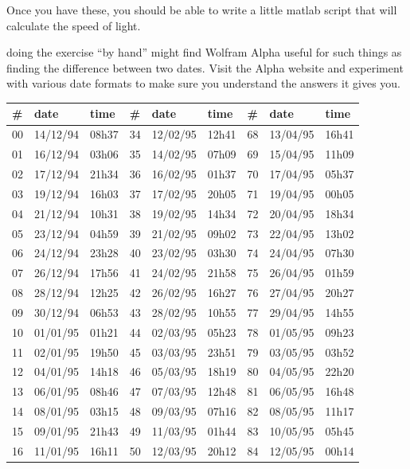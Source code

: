 \documentclass{tufte-handout}
\begin{document}
Once you have these, you should be able to write a little {\sc matlab} script that will calculate the speed of light.

 doing the exercise ``by hand'' might find Wolfram Alpha useful for such things as finding the difference between two dates.  Visit the Alpha website and experiment with various date formats to make sure you understand the answers it gives you.


\begin{table}
\begin{tabular}{lll|lll|lll}
\# & date & time & \# & date & time & \# & date & time \\ \hline
00 & 14/12/94 & 08h37 & 34 & 12/02/95 & 12h41 & 68 & 13/04/95 & 16h41 \\
01 & 16/12/94 & 03h06 & 35 & 14/02/95 & 07h09 & 69 & 15/04/95 & 11h09 \\
02 & 17/12/94 & 21h34 & 36 & 16/02/95 & 01h37 & 70 & 17/04/95 & 05h37 \\
03 & 19/12/94 & 16h03 & 37 & 17/02/95 & 20h05 & 71 & 19/04/95 & 00h05 \\
04 & 21/12/94 & 10h31 & 38 & 19/02/95 & 14h34 & 72 & 20/04/95 & 18h34 \\
05 & 23/12/94 & 04h59 & 39 & 21/02/95 & 09h02 & 73 & 22/04/95 & 13h02 \\
06 & 24/12/94 & 23h28 & 40 & 23/02/95 & 03h30 & 74 & 24/04/95 & 07h30 \\
07 & 26/12/94 & 17h56 & 41 & 24/02/95 & 21h58 & 75 & 26/04/95 & 01h59 \\
08 & 28/12/94 & 12h25 & 42 & 26/02/95 & 16h27 & 76 & 27/04/95 & 20h27 \\
09 & 30/12/94 & 06h53 & 43 & 28/02/95 & 10h55 & 77 & 29/04/95 & 14h55 \\
10 & 01/01/95 & 01h21 & 44 & 02/03/95 & 05h23 & 78 & 01/05/95 & 09h23 \\
11 & 02/01/95 & 19h50 & 45 & 03/03/95 & 23h51 & 79 & 03/05/95 & 03h52 \\
12 & 04/01/95 & 14h18 & 46 & 05/03/95 & 18h19 & 80 & 04/05/95 & 22h20 \\
13 & 06/01/95 & 08h46 & 47 & 07/03/95 & 12h48 & 81 & 06/05/95 & 16h48 \\
14 & 08/01/95 & 03h15 & 48 & 09/03/95 & 07h16 & 82 & 08/05/95 & 11h17 \\
15 & 09/01/95 & 21h43 & 49 & 11/03/95 & 01h44 & 83 & 10/05/95 & 05h45 \\
16 & 11/01/95 & 16h11 & 50 & 12/03/95 & 20h12 & 84 & 12/05/95 & 00h14 \\

\end{tabular}
\end{table}
\end{document}

